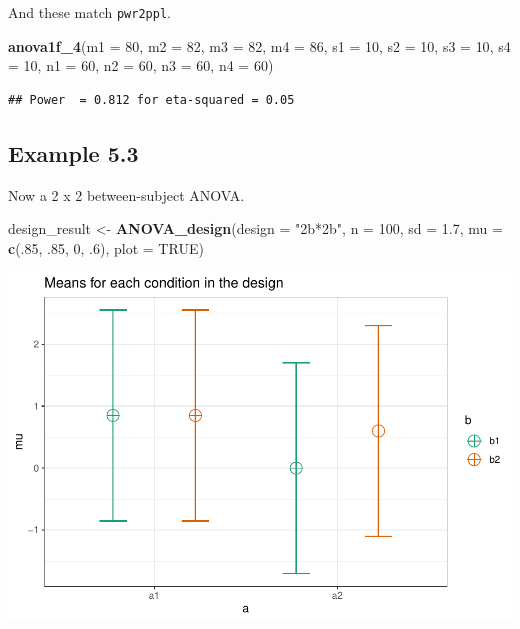 \documentclass[]{book}
\newenvironment{Shaded}{\begin{snugshade}}{\end{snugshade}}
\newcommand{\DataTypeTok}[1]{\textcolor[rgb]{0.13,0.29,0.53}{#1}}
\newcommand{\DecValTok}[1]{\textcolor[rgb]{0.00,0.00,0.81}{#1}}
\newcommand{\FloatTok}[1]{\textcolor[rgb]{0.00,0.00,0.81}{#1}}
\newcommand{\KeywordTok}[1]{\textcolor[rgb]{0.13,0.29,0.53}{\textbf{#1}}}
\newcommand{\NormalTok}[1]{#1}
\newcommand{\OtherTok}[1]{\textcolor[rgb]{0.56,0.35,0.01}{#1}}
\newcommand{\StringTok}[1]{\textcolor[rgb]{0.31,0.60,0.02}{#1}}
\begin{document}
And these match \texttt{pwr2ppl}.

\begin{Shaded}
\begin{Highlighting}[]
\KeywordTok{anova1f_4}\NormalTok{(}\DataTypeTok{m1 =} \DecValTok{80}\NormalTok{, }\DataTypeTok{m2 =} \DecValTok{82}\NormalTok{, }\DataTypeTok{m3 =} \DecValTok{82}\NormalTok{, }\DataTypeTok{m4 =} \DecValTok{86}\NormalTok{,}
          \DataTypeTok{s1 =} \DecValTok{10}\NormalTok{, }\DataTypeTok{s2 =} \DecValTok{10}\NormalTok{, }\DataTypeTok{s3 =} \DecValTok{10}\NormalTok{, }\DataTypeTok{s4 =} \DecValTok{10}\NormalTok{,}
          \DataTypeTok{n1 =} \DecValTok{60}\NormalTok{, }\DataTypeTok{n2 =} \DecValTok{60}\NormalTok{, }\DataTypeTok{n3 =} \DecValTok{60}\NormalTok{, }\DataTypeTok{n4 =} \DecValTok{60}\NormalTok{)}
\end{Highlighting}
\end{Shaded}

\begin{verbatim}
## Power  = 0.812 for eta-squared = 0.05
\end{verbatim}

\hypertarget{example-5.3}{%
\subsection{Example 5.3}\label{example-5.3}}

Now a 2 x 2 between-subject ANOVA.

\begin{Shaded}
\begin{Highlighting}[]
\NormalTok{design_result <-}\StringTok{ }\KeywordTok{ANOVA_design}\NormalTok{(}\DataTypeTok{design =} \StringTok{"2b*2b"}\NormalTok{,}
                              \DataTypeTok{n =} \DecValTok{100}\NormalTok{,}
                              \DataTypeTok{sd =} \FloatTok{1.7}\NormalTok{,}
                              \DataTypeTok{mu =} \KeywordTok{c}\NormalTok{(.}\DecValTok{85}\NormalTok{, }\FloatTok{.85}\NormalTok{, }
                                     \DecValTok{0}\NormalTok{, }\FloatTok{.6}\NormalTok{),}
                              \DataTypeTok{plot =} \OtherTok{TRUE}\NormalTok{)}
\end{Highlighting}
\end{Shaded}

\includegraphics{SuperpowerValidation_files/figure-latex/aberson_5.3.2-1.pdf}
\end{document}
